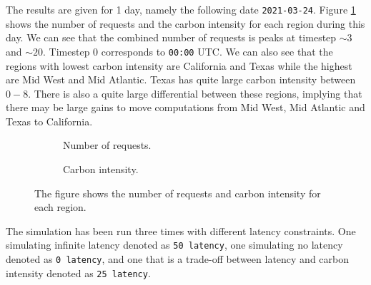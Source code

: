 
The results are given for 1 day, namely the following date \texttt{2021-03-24}. Figure \ref{fig:requests_carbon} shows the number of requests and the carbon intensity for each region during this day. We can see that the combined number of requests is peaks at timestep $\sim 3$ and $\sim 20$. Timestep 0 corresponds to \texttt{00:00} UTC. We can also see that the regions with lowest carbon intensity are California and Texas while the highest are Mid West and Mid Atlantic. Texas has quite large carbon intensity between $0 - 8$. There is also a quite large differential between these regions, implying that there may be large gains to move computations from Mid West, Mid Atlantic and Texas to California.

\begin{figure}[H]
    \centering
    \begin{subfigure}[b]{0.23\textwidth}
        \centering
        
        \caption{Number of requests.}    
    \end{subfigure}
    \hfill
    \begin{subfigure}[b]{0.23\textwidth}  
        \centering 
        
        \caption{Carbon intensity.}    
    \end{subfigure}
    \caption{The figure shows the number of requests and carbon intensity for each region.}
    \label{fig:requests_carbon}
\end{figure}

The simulation has been run three times with different latency constraints. One simulating infinite latency denoted as \texttt{50 latency}, one simulating no latency denoted as \texttt{0 latency}, and one that is a trade-off between latency and carbon intensity denoted as \texttt{25 latency}.


